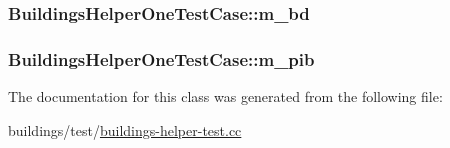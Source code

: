 \subsubsection[{\texorpdfstring{m\+\_\+bd}{m_bd}}]{ Buildings\+Helper\+One\+Test\+Case\+::m\+\_\+bd\hspace{0.3cm}{\ttfamily [private]}}\hypertarget{classBuildingsHelperOneTestCase_a4e5e58e9f67409bd4fe0a25e0ffda4bb}{}\label{classBuildingsHelperOneTestCase_a4e5e58e9f67409bd4fe0a25e0ffda4bb}
\subsubsection[{\texorpdfstring{m\+\_\+pib}{m_pib}}]{ Buildings\+Helper\+One\+Test\+Case\+::m\+\_\+pib\hspace{0.3cm}{\ttfamily [private]}}\hypertarget{classBuildingsHelperOneTestCase_aab8bca809365d6613287ffa50e946bb2}{}\label{classBuildingsHelperOneTestCase_aab8bca809365d6613287ffa50e946bb2}


The documentation for this class was generated from the following file\+:\begin{DoxyCompactItemize}
\item 
buildings/test/\hyperlink{buildings-helper-test_8cc}{buildings-\/helper-\/test.\+cc}\end{DoxyCompactItemize}
